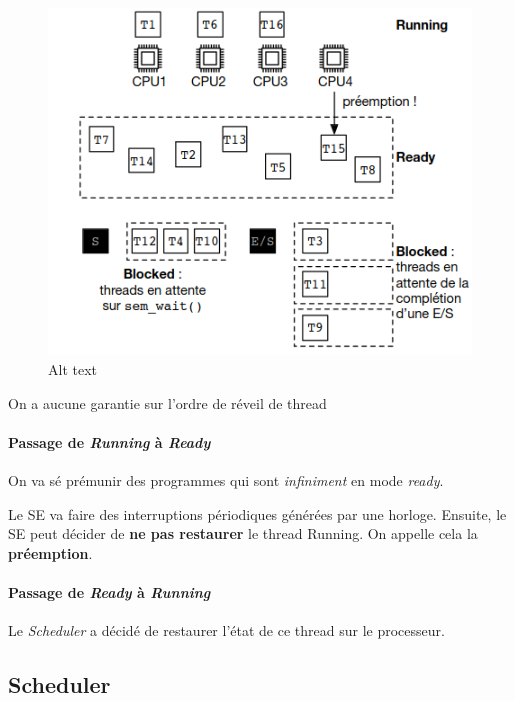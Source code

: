 \begin{figure}
\centering
\includegraphics{image-30.png}
\caption{Alt text}
\end{figure}

On a aucune garantie sur l'ordre de réveil de thread

\paragraph{\texorpdfstring{Passage de \emph{Running} à
\emph{Ready}}{Passage de Running à Ready}}\label{passage-de-running-uxe0-ready}

On va sé prémunir des programmes qui sont \emph{infiniment} en mode
\emph{ready}.

Le SE va faire des interruptions périodiques générées par une horloge.
Ensuite, le SE peut décider de \textbf{ne pas restaurer} le thread
Running. On appelle cela la \textbf{préemption}.

\paragraph{\texorpdfstring{Passage de \emph{Ready} à
\emph{Running}}{Passage de Ready à Running}}\label{passage-de-ready-uxe0-running}

Le \emph{Scheduler} a décidé de restaurer l'état de ce thread sur le
processeur.

\subsection{Scheduler}\label{scheduler}

